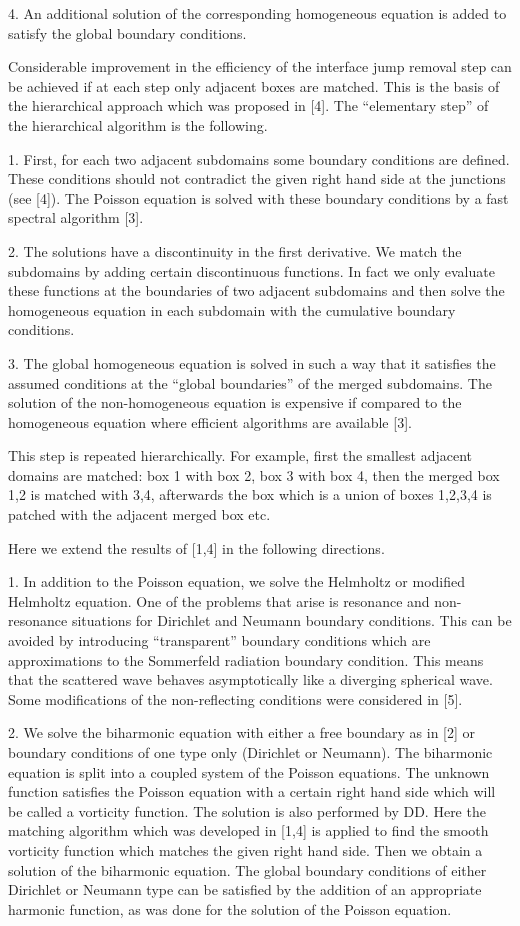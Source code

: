 \documentclass[11pt]{article}
\begin{document}
4. An additional solution of the corresponding homogeneous equation is
added to satisfy the global boundary conditions.


Considerable improvement in the efficiency of
the interface jump removal step can be achieved if at each step only
adjacent boxes are matched. This is the basis of the hierarchical
approach which was proposed in [4].
The ``elementary step'' of the hierarchical algorithm is the following.

1. First, for each two adjacent subdomains some boundary conditions
are defined.
These conditions should not contradict the given right hand side
at the junctions (see [4]).
The Poisson equation is solved with these boundary
conditions by a fast spectral algorithm [3].

2. The solutions have a discontinuity in the first derivative.
We match the subdomains by adding certain discontinuous
functions. In fact we only evaluate these functions at the boundaries
of two adjacent subdomains and then
solve the homogeneous equation in each subdomain with the cumulative
boundary conditions.

3. The global homogeneous equation is solved in such a way that
it satisfies
the assumed conditions at the ``global boundaries'' of the merged
subdomains.
The solution of the non-homogeneous equation is expensive
if compared to the homogeneous equation where efficient algorithms
are available [3].

This step is repeated hierarchically.
For example, first the smallest adjacent domains are matched:
box 1 with box 2, box 3 with box 4, then the merged box 1,2 is
matched with 3,4, afterwards the box which is a union of boxes 1,2,3,4
is patched with the adjacent merged box etc.

Here we extend the results of [1,4] in the following directions.

1. In addition to the Poisson equation, we solve
the Helmholtz or modified Helmholtz equation.
One of the problems that arise is
resonance and non-resonance situations
for Dirichlet and Neumann boundary conditions.
This can be avoided by introducing
``transparent'' boundary conditions which are
approximations to the Sommerfeld radiation
boundary condition.
This means that the scattered wave behaves
asymptotically like a diverging spherical wave. Some modifications
of the non-reflecting conditions were considered in [5].

2. We solve the biharmonic equation with either a free boundary
as in [2] or
boundary conditions of one type only
(Dirichlet or Neumann).
The biharmonic equation is split into a coupled system of
the Poisson equations. The unknown function satisfies the Poisson equation
with a certain right hand side which will be called a vorticity
function.
The solution  is also performed by DD.
Here the matching algorithm which was developed in [1,4]
is applied to find the smooth vorticity function which matches
the given right hand side. Then we obtain a solution of the
biharmonic equation. The global boundary conditions of either
Dirichlet or Neumann
type can be satisfied by the addition of an appropriate
harmonic function, as was done for the solution of the Poisson equation.
\end{document}

